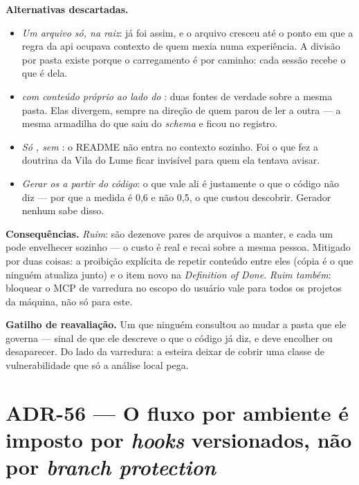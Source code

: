 \textbf{Alternativas descartadas.}
\begin{itemize}
  \item \emph{Um arquivo só, na raiz}: já foi assim, e o arquivo cresceu até o
    ponto em que a regra da api ocupava contexto de quem mexia numa experiência.
    A divisão por pasta existe porque o carregamento é por caminho: cada sessão
    recebe o que é dela.
  \item \emph{ com conteúdo próprio ao lado do }:
    duas fontes de verdade sobre a mesma pasta. Elas divergem, sempre na direção
    de quem parou de ler a outra --- a mesma armadilha do  que
    saiu do \emph{schema} e ficou no registro.
  \item \emph{Só , sem }: o README não entra no
    contexto sozinho. Foi o que fez a doutrina da Vila do Lume ficar invisível
    para quem ela tentava avisar.
  \item \emph{Gerar os  a partir do código}: o que vale ali é
    justamente o que o código não diz --- por que a medida é 0{,}6 e não 0{,}5,
    o que custou descobrir. Gerador nenhum sabe disso.
\end{itemize}

\textbf{Consequências.} \emph{Ruim}: são dezenove pares de arquivos a manter, e
cada um pode envelhecer sozinho --- o custo é real e recai sobre a mesma pessoa.
Mitigado por duas coisas: a proibição explícita de repetir conteúdo entre eles
(cópia é o que ninguém atualiza junto) e o item novo na \emph{Definition of
Done}. \emph{Ruim também}: bloquear o MCP de varredura no escopo do usuário vale
para todos os projetos da máquina, não só para este.

\textbf{Gatilho de reavaliação.} Um  que ninguém consultou ao
mudar a pasta que ele governa --- sinal de que ele descreve o que o código já
diz, e deve encolher ou desaparecer. Do lado da varredura: a esteira deixar de
cobrir uma classe de vulnerabilidade que só a análise local pega.

\section{ADR-56 --- O fluxo por ambiente é imposto por \emph{hooks} versionados,
não por \emph{branch protection}}
\label{adr:fluxo-por-hooks}

